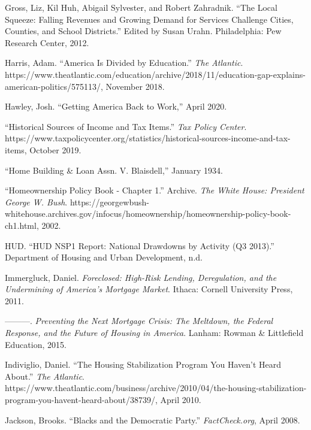 \documentclass[12pt,oneside]{psthesis}
\begin{document}
\leavevmode\hypertarget{ref-gross2012local}{}%
Gross, Liz, Kil Huh, Abigail Sylvester, and Robert Zahradnik. ``The Local Squeeze: Falling Revenues and Growing Demand for Services Challenge Cities, Counties, and School Districts.'' Edited by Susan Urahn. Philadelphia: Pew Research Center, 2012.

\leavevmode\hypertarget{ref-harris2018america}{}%
Harris, Adam. ``America Is Divided by Education.'' \emph{The Atlantic}. https://www.theatlantic.com/education/archive/2018/11/education-gap-explains-american-politics/575113/, November 2018.

\leavevmode\hypertarget{ref-hawley2020getting}{}%
Hawley, Josh. ``Getting America Back to Work,'' April 2020.

\leavevmode\hypertarget{ref-2019historical}{}%
``Historical Sources of Income and Tax Items.'' \emph{Tax Policy Center}. https://www.taxpolicycenter.org/statistics/historical-sources-income-and-tax-items, October 2019.

\leavevmode\hypertarget{ref-1934home}{}%
``Home Building \& Loan Assn. V. Blaisdell,'' January 1934.

\leavevmode\hypertarget{ref-2002homeownership}{}%
``Homeownership Policy Book - Chapter 1.'' Archive. \emph{The White House: President George W. Bush}. https://georgewbush-whitehouse.archives.gov/infocus/homeownership/homeownership-policy-book-ch1.html, 2002.

\leavevmode\hypertarget{ref-hud2013hud}{}%
HUD. ``HUD NSP1 Report: National Drawdowns by Activity (Q3 2013).'' Department of Housing and Urban Development, n.d.

\leavevmode\hypertarget{ref-immergluck2011foreclosed}{}%
Immergluck, Daniel. \emph{Foreclosed: High-Risk Lending, Deregulation, and the Undermining of America's Mortgage Market}. Ithaca: Cornell University Press, 2011.

\leavevmode\hypertarget{ref-immergluckPreventingNextMortgage2015}{}%
---------. \emph{Preventing the Next Mortgage Crisis: The Meltdown, the Federal Response, and the Future of Housing in America}. Lanham: Rowman \& Littlefield Education, 2015.

\leavevmode\hypertarget{ref-indiviglio2010housing}{}%
Indiviglio, Daniel. ``The Housing Stabilization Program You Haven't Heard About.'' \emph{The Atlantic}. https://www.theatlantic.com/business/archive/2010/04/the-housing-stabilization-program-you-havent-heard-about/38739/, April 2010.

\leavevmode\hypertarget{ref-jackson2008blacks}{}%
Jackson, Brooks. ``Blacks and the Democratic Party.'' \emph{FactCheck.org}, April 2008.
\end{document}
